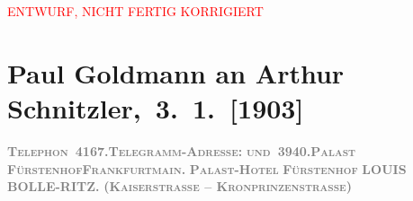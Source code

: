 
\begin{center}
            \textcolor{red}{ENTWURF, NICHT FERTIG KORRIGIERT}
                      \end{center}
            
         
         \renewcommand{\erwaehntePersonen}{Personen:  ?? [Partner von Theodore Rottenberg, Ende 1902/Anfang 1903], Louis Bolle-Ritz, Heinrich Heine, Elise Krinitz, Theodore Rottenberg, Olga Schnitzler, Heinrich Schnitzler}
         \renewcommand{\erwaehnteOrte}{Orte: Frankfurt am Main, Fürstenhof, Kaiserstraße, Monte Carlo, Münchener Straße, Wien}
         \renewcommand{\erwaehnteWerke}{Werke: Gedichte an die Mouche}
               \section[ Paul Goldmann an Arthur Schnitzler, 3. 1. {[}1903{]}]{ Paul Goldmann an Arthur Schnitzler, 3. 1. {[}1903{]}}\nopagebreak{}\rehead{ }\begin{ledgroupsized}[t]{13cm}\normalsize\beginnumbering \toendnotes[C]{\smallbreak\pagebreak[2]} 
\toendnotes[C]{\smallbreak}\pstart
           \noindent{}{\pb}\textcolor{gray}{\textbf{\textsc{Telephon \textbf{4167.}}}}\hfill \textcolor{gray}{\textbf{\textsc{Telegramm-Adresse:}}}\pend
           \pstart
           \textcolor{gray}{\textbf{\textsc{und \textbf{3940.}}}}\hfill \textcolor{gray}{\textbf{\textbf{\textsc{Palast FürstenhofFrankfurtmain.}}}}\pend
           \pstart
           \centering{}\textcolor{gray}{\textbf{\textsc{\textbf{Palast-Hotel}}}}\pend
           \pstart
           \noindent{}\centering{}\textcolor{gray}{\textbf{\textsc{Fürstenhof}}}\pend
           \pstart
           \noindent{}\centering{}\textcolor{gray}{\textbf{LOUIS BOLLE-RITZ.}}\pend
           \pstart
           \noindent{}\centering{}\textcolor{gray}{\textbf{\textsc{(Kaiserstrasse – Kronprinzenstrasse)}}}\pend

\end{ledgroupsized}

